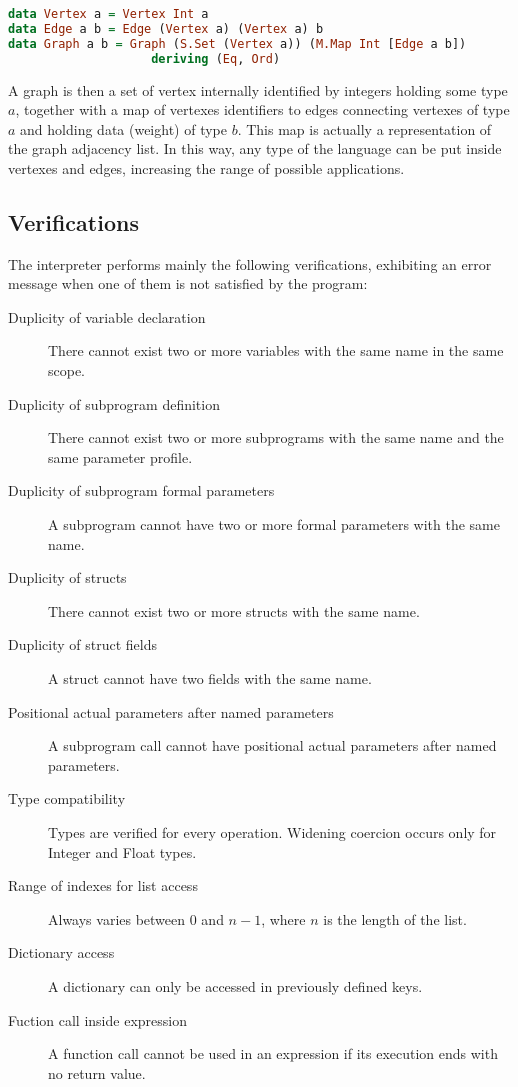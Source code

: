 \begin{lstlisting}[language=Haskell, basicstyle=\footnotesize]
data Vertex a = Vertex Int a
data Edge a b = Edge (Vertex a) (Vertex a) b
data Graph a b = Graph (S.Set (Vertex a)) (M.Map Int [Edge a b]) 
                    deriving (Eq, Ord)
\end{lstlisting}

A graph is then a set of vertex internally identified by integers holding some type $a$, together with
a map of vertexes identifiers to edges connecting vertexes of type $a$ and holding data (weight)
of type $b$. This map is actually a representation of the graph adjacency list. 
In this way, any type of the language can be put inside vertexes and
edges, increasing the range of possible applications.



\subsection{Verifications}

The interpreter performs mainly the following verifications, exhibiting
an error message when one of them is not satisfied by the
program:

\begin{description}
    \item[Duplicity of variable declaration] There cannot exist two or more
        variables with the same name in the same 
        scope.
    \item[Duplicity of subprogram definition] There cannot exist two
        or more subprograms with the same name and the same parameter
        profile.
    \item[Duplicity of subprogram formal parameters] A subprogram
        cannot have two or more formal parameters with the same name.
    \item[Duplicity of structs] There cannot exist two or more
        structs with the same name.
    \item[Duplicity of struct fields] A struct cannot have two fields
        with the same name.
    \item[Positional actual parameters after named parameters] A subprogram
        call cannot have positional actual parameters after named parameters.
    \item[Type compatibility] Types are verified for every operation.
        Widening coercion occurs only for Integer and Float types.
    \item[Range of indexes for list access] Always varies
        between 0 and $n-1$, where $n$ is the length of the list.
    \item[Dictionary access] A dictionary can only be accessed in
        previously defined keys.
    \item[Fuction call inside expression] A function call cannot
        be used in an expression if its execution ends with no
        return value.
\end{description}
